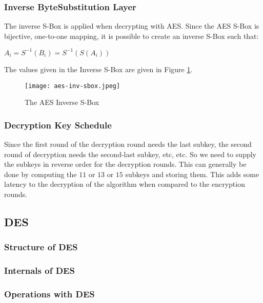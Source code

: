 \subsubsection{Inverse ByteSubstitution Layer}

The inverse S-Box is applied when decrypting with AES. Since the AES S-Box is bijective, one-to-one mapping, it is possible to create an inverse S-Box such that:

\begin{center}
$A_i = S^{-1}(B_i) = S^{-1}(S(A_i))$
\end{center}

The values given in the Inverse S-Box are given in Figure \ref{AES-InvS-BOX}.

\begin{figure}[h!]
\begin{center}
\texttt{[image: aes-inv-sbox.jpeg]}
\end{center}
\caption{The AES Inverse S-Box}
\label{AES-InvS-BOX}
\end{figure}

\subsubsection{Decryption Key Schedule}

Since the first round of the decryption round needs the last subkey, the second round of decryption needs the second-last subkey, etc, etc. So we need to supply the subkeys in reverse order for the decryption rounds. This can generally be done by computing the $11$ or $13$ or $15$ subkeys and storing them. This adds some latency to the decryption of the algorithm when compared to the encryption rounds. 

\subsection{DES}
\subsubsection{Structure of DES}
\subsubsection{Internals of DES}
\subsubsection{Operations with DES}

